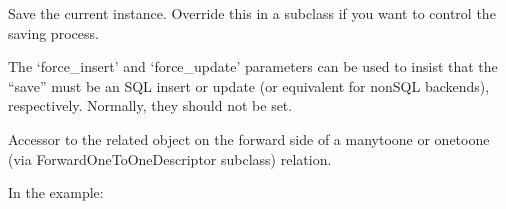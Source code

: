 \documentclass[letterpaper,10pt,english]{sphinxmanual}
\begin{document}
\begin{fulllineitems}
\begin{fulllineitems}
\end{fulllineitems}


\begin{fulllineitems}
\label{\detokenize{payments:payments.models.OrganisationTransaction.other_organisation_id}}
\end{fulllineitems}


\begin{fulllineitems}
\label{\detokenize{payments:payments.models.OrganisationTransaction.save}}
Save the current instance. Override this in a subclass if you want to
control the saving process.

The ‘force\_insert’ and ‘force\_update’ parameters can be used to insist
that the “save” must be an SQL insert or update (or equivalent for
non\sphinxhyphen{}SQL backends), respectively. Normally, they should not be set.

\end{fulllineitems}


\begin{fulllineitems}
\label{\detokenize{payments:payments.models.OrganisationTransaction.stripe_transaction}}
Accessor to the related object on the forward side of a many\sphinxhyphen{}to\sphinxhyphen{}one or
one\sphinxhyphen{}to\sphinxhyphen{}one (via ForwardOneToOneDescriptor subclass) relation.

In the example:

\begin{sphinxVerbatim}[commandchars=\\\{\}]
 
       
\end{sphinxVerbatim}


\end{fulllineitems}
\end{fulllineitems}
\end{document}
